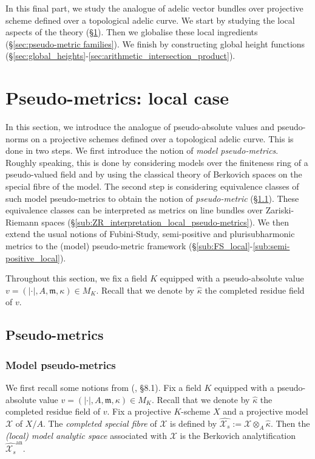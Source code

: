 \documentclass [11pt,reqno]{amsart}
\newcommand{\1}{\mathmybb{1}}
\def\cX{{\mathcal{X}}}
\def\m{\mathfrak m}
\def\an{\operatorname{an}}
\newcommand{\va}{|\cdot|}
\begin{document}
In this final part, we study the analogue of adelic vector bundles over projective scheme defined over a topological adelic curve. We start by studying the local aspects of the theory (\S \ref{sec:metrics_MA_intersection_local}). Then we globalise these local ingredients (\S \ref{sec:pseudo-metric families}). We finish by constructing global height functions (\S \ref{sec:global_heights}-\ref{sec:arithmetic_intersection_product}).

\section{Pseudo-metrics: local case}
\label{sec:metrics_MA_intersection_local}

In this section, we introduce the analogue of pseudo-absolute values and pseudo-norms on a projective schemes defined over a topological adelic curve. This is done in two steps. We first introduce the notion of \emph{model pseudo-metrics}. Roughly speaking, this is done by considering models over the finiteness ring of a pseudo-valued field and by using the classical theory of Berkovich spaces on the special fibre of the model. The second step is considering equivalence classes of such model pseudo-metrics to obtain the notion of \emph{pseudo-metric} (\S \ref{sub:local_pseudo-metric}). These equivalence classes can be interpreted as metrics on line bundles over Zariski-Riemann spaces (\S \ref{sub:ZR_interpretation_local_pseudo-metrics}). We then extend the usual notions of Fubini-Study, semi-positive and plurisubharmonic metrics to the (model) pseudo-metric framework (\S \ref{sub:FS_local}-\ref{sub:semi-positive_local}). 


Throughout this section, we fix a field $K$ equipped with a pseudo-absolute value $v=(\va,A,\m,\kappa)\in M_{K}$. Recall that we denote by $\widehat{\kappa}$ the completed residue field of $v$.

\subsection{Pseudo-metrics}
\label{sub:local_pseudo-metric}

\subsubsection{Model pseudo-metrics}
\label{subsub:model_pseudo-metric}

We first recall some notions from (\cite{Sedillot_pav}, \S 8.1). Fix a field $K$ equipped with a pseudo-absolute value $v=(\va,A,\m,\kappa)\in M_{K}$. Recall that we denote by $\widehat{\kappa}$ the completed residue field of $v$. Fix a projective $K$-scheme $X$ and a projective model $\cX$ of $X/A$. The \emph{completed special fibre} of $\cX$ is defined by $\widehat{\cX_s}:=\cX \otimes_{A} \widehat{\kappa}$. Then the \emph{(local) model analytic space} associated with $\cX$ is the Berkovich analytification $\widehat{\cX_s}^{\an}$. 
\end{document}
